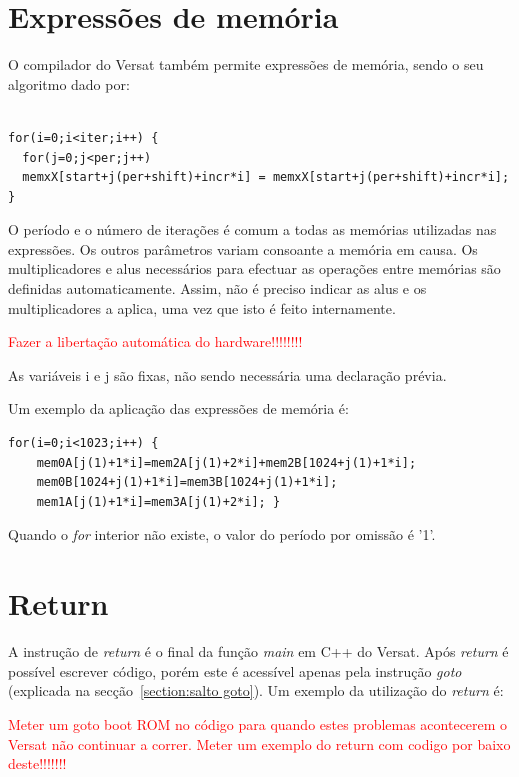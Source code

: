 \section{Expressões de memória}
\label{section:expressoes de memoria}


O compilador do Versat também permite expressões de memória, sendo o seu algoritmo dado por:

\begin{lstlisting}

for(i=0;i<iter;i++) {
  for(j=0;j<per;j++)  
  memxX[start+j(per+shift)+incr*i] = memxX[start+j(per+shift)+incr*i];  }

\end{lstlisting}

O período e o número de iterações é comum a todas as memórias utilizadas nas expressões. Os outros parâmetros variam consoante a memória em causa.
Os multiplicadores e alus necessários para efectuar as operações entre memórias são definidas automaticamente. Assim, não é preciso indicar as alus e os 
multiplicadores a aplica, uma vez que isto é feito internamente.

\textcolor{red}{Fazer a libertação automática do hardware!!!!!!!!}


As variáveis i e j são fixas, não sendo necessária uma declaração prévia. 


Um exemplo da aplicação das expressões de memória é:

\begin{lstlisting}
for(i=0;i<1023;i++) {
	mem0A[j(1)+1*i]=mem2A[j(1)+2*i]+mem2B[1024+j(1)+1*i];  
	mem0B[1024+j(1)+1*i]=mem3B[1024+j(1)+1*i]; 
	mem1A[j(1)+1*i]=mem3A[j(1)+2*i]; }
\end{lstlisting}


Quando o {\it for} interior não existe, o valor do período por omissão é '1'.



\section{Return}
\label{section:return}


A instrução de {\it return} é o final da função {\it main} em C++ do Versat. Após {\it return} é possível escrever código, porém este é acessível apenas 
pela instrução {\it goto} (explicada na secção~\ref{section:salto goto}). 
Um exemplo da utilização do {\it return} é:

\textcolor{red}{Meter um goto boot ROM no código para quando estes problemas acontecerem o Versat não continuar a correr. Meter um exemplo do return com codigo por baixo deste!!!!!!!}


